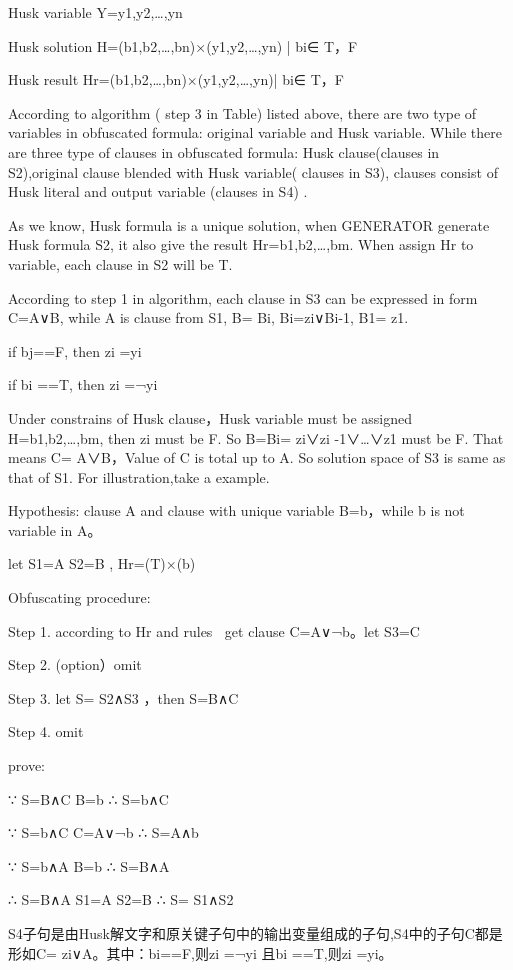 \documentclass[runningheads,a4paper]{llncs}
\begin{document}
Husk variable  	Y={y1,y2,…,yn }

Husk solution	        H={(b1,b2,…,bn)×(y1,y2,…,yn) | bi∈ {T，F}}

Husk result	        Hr={(b1,b2,…,bn)×(y1,y2,…,yn)| bi∈ {T，F}}

According to algorithm ( step 3 in Table) listed above, there are two type of variables in obfuscated formula: original variable and Husk variable. While there are three type of clauses in obfuscated formula: Husk clause(clauses in S2),original clause blended with Husk variable( clauses in S3), clauses consist of Husk literal and output variable (clauses in S4) .

As we know, Husk formula is a unique solution, when GENERATOR generate Husk formula S2, it also give the result Hr={b1,b2,…,bm}. When assign Hr to variable, each clause in S2 will be T.

According to step 1 in algorithm, each clause in S3 can be expressed in form C=A∨B, while A is clause from S1, B= Bi, Bi=zi∨Bi-1, B1= z1.

if bj==F, then zi =yi

if bi ==T, then zi =¬yi

Under constrains of Husk clause，Husk variable must be assigned H={b1,b2,…,bm}, then zi must be F. So B=Bi= zi∨zi -1∨…∨z1 must be F. That means C= A∨B，Value of C is total up to A. So solution space of S3 is same as that of S1. For illustration,take a example.

\noindent Hypothesis: clause A and clause with unique variable B=b，while b is not variable in A。

let S1=A S2=B , Hr={(T)×(b) }

\noindent Obfuscating procedure:

Step 1. according to Hr and rules ，get clause C=A∨¬b。let S3=C

Step 2. (option）omit

Step 3. let S= S2∧S3 ，then S=B∧C

Step 4. omit

\noindent prove:

∵ S=B∧C  B=b      ∴ S=b∧C   

∵ S=b∧C  C=A∨¬b  ∴ S=A∧b  

∵ S=b∧A  B=b      ∴ S=B∧A

∴ S=B∧A  S1=A S2=B ∴ S= S1∧S2

S4子句是由Husk解文字和原关键子句中的输出变量组成的子句,S4中的子句C都是形如C= zi∨A。其中：bi==F,则zi =¬yi 且bi ==T,则zi =yi。
\end{document}
